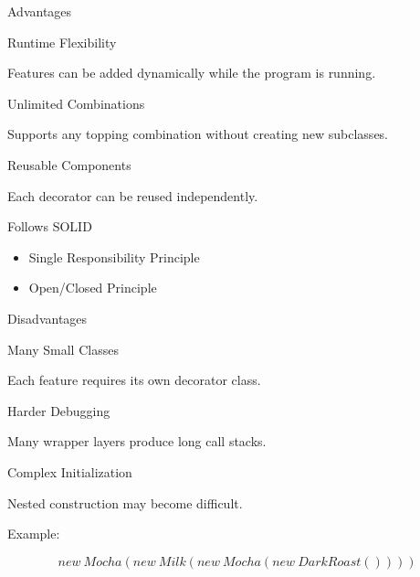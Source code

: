 \documentclass[aspectratio=169]{beamer}
\begin{document}
\begin{frame}{Advantages}

\begin{block}{Runtime Flexibility}

Features can be added dynamically while the program is running.

\end{block}

\pause

\begin{block}{Unlimited Combinations}

Supports any topping combination without creating new subclasses.

\end{block}

\pause

\begin{block}{Reusable Components}

Each decorator can be reused independently.

\end{block}

\pause

\begin{block}{Follows SOLID}

\begin{itemize}

\item Single Responsibility Principle

\item Open/Closed Principle

\end{itemize}

\end{block}

\end{frame}


\begin{frame}{Disadvantages}

\begin{block}{Many Small Classes}

Each feature requires its own decorator class.

\end{block}

\pause

\begin{block}{Harder Debugging}

Many wrapper layers produce long call stacks.

\end{block}

\pause

\begin{block}{Complex Initialization}

Nested construction may become difficult.

Example:

\[
new\ Mocha(
new\ Milk(
new\ Mocha(
new\ DarkRoast())))
\]

\end{block}

\end{frame}
\end{document}
